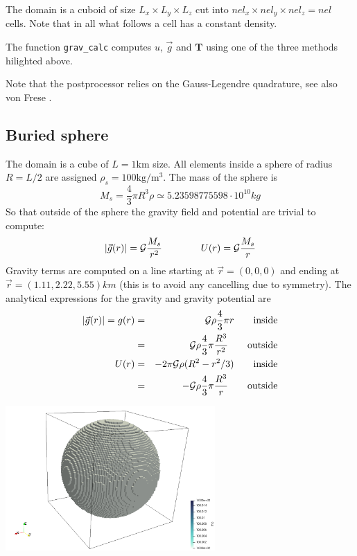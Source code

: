 The domain is a cuboid of size $L_x\times L_y \times L_z$ cut into $nel_x \times nel_y \times nel_z=nel$ cells.
Note that in all what follows a cell has a constant density. 

The function {\tt grav\_calc} computes $u$, $\vec{g}$ and ${\bm T}$ using one of the three methods hilighted above. 

Note that the \aspect postprocessor relies on the Gauss-Legendre quadrature, see also von Frese \etal \cite{vohb81}.

\newpage
\subsection*{Buried sphere}

The domain is a cube of $L=1\si{\km}$ size. All elements inside a sphere of radius $R=L/2$ are assigned
$\rho_s=100\si{\kg\per\cubic\metre}$.
The mass of the sphere is 
\[
M_s = \frac{4}{3}\pi R^3 \rho \simeq 5.23598775598 \cdot 10^{10} \si{kg}
\]
So that outside of the sphere the gravity field and potential are trivial to compute:
\[
|\vec{g}(r)|={\cal G}\frac{M_s}{r^2}
\qquad
\qquad
U(r)={\cal G}\frac{M_s}{r}
\]
Gravity terms are computed on a line starting at $\vec{r}=(0,0,0)$ and ending at $\vec{r}=(1.11,2.22,5.55)\si{km}$ (this is to avoid any cancelling due to symmetry).
The analytical expressions for the gravity and gravity potential are 
\begin{eqnarray}
|\vec{g}(r)|=g(r) 
&=& {\cal G} \rho \frac{4}{3}\pi r \qquad \text{inside} \nonumber\\
&=& {\cal G} \rho \frac{4}{3}\pi \frac{R^3}{r^2}  \qquad \text{outside} \nonumber\\
U(r) 
&=& - 2 \pi {\cal G} \rho (R^2-r^2/3) \qquad \text{inside} \nonumber\\
&=& - {\cal G} \rho \frac{4}{3}\pi \frac{R^3}{r}  \qquad \text{outside} \nonumber
\end{eqnarray}

\begin{center}
\includegraphics[width=8cm]{python_codes/fieldstone_84/sphere/setup}
\end{center}


